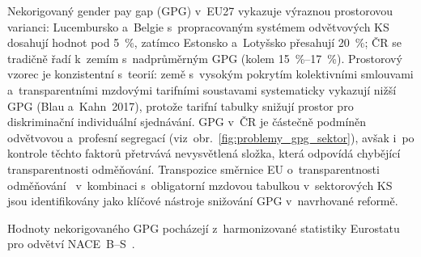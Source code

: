 Nekorigovaný gender pay gap (\ac{GPG}) v~EU27 vykazuje výraznou prostorovou varianci: Lucembursko a~Belgie s~propracovaným systémem odvětvových \ac{KS} dosahují hodnot pod \SI{5}{\percent}, zatímco Estonsko a~Lotyšsko přesahují \SI{20}{\percent}; ČR se tradičně řadí k~zemím s~nadprůměrným \ac{GPG} (kolem \SIrange{15}{17}{\percent}).
Prostorový vzorec je konzistentní s~teorií: země s~vysokým pokrytím kolektivními smlouvami a~transparentními mzdovými tarifními soustavami systematicky vykazují nižší \ac{GPG} (Blau a~Kahn~2017), protože tarifní tabulky snižují prostor pro diskriminační individuální sjednávání.
\ac{GPG} v~ČR je částečně podmíněn odvětvovou a~profesní segregací (viz~obr.~\ref{fig:problemy_gpg_sektor}), avšak i~po kontrole těchto faktorů přetrvává nevysvětlená složka, která odpovídá chybějící transparentnosti odměňování.
Transpozice směrnice \ac{EU} o~transparentnosti odměňování~\cite{smernice_pay_transparency_2023} v~kombinaci s~obligatorní mzdovou tabulkou v~sektorových \ac{KS} jsou identifikovány jako klíčové nástroje snižování \ac{GPG} v~navrhované reformě.

Hodnoty nekorigovaného \acs{GPG} pocházejí z~harmonizované statistiky Eurostatu pro odvětví \acs{NACE}~B--S~\cite{eurostat_gpg}.\par


